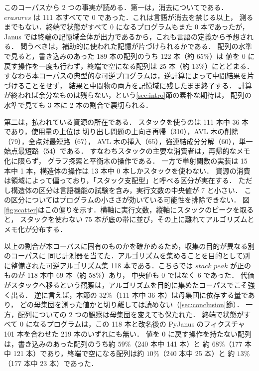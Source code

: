 \documentclass[a4paper,11pt]{jsarticle}
\begin{document}
このコーパスから 2 つの事実が読める．第一は，消去についてである．
$\mathit{erasures}$ は 111 本すべてで 0 であった．これは言語が消去を禁じる以上，
測るまでもない．終端で状態がすべて 0 になるプログラムもまた 0 本であったが，
Janus では終端の記憶域全体が出力であるから，これも言語の定義から予想される．
問うべきは，補助的に使われた記憶が片づけられるかである．
配列の水準で見ると，書き込みのあった 189 本の配列のうち 122 本（約 $65\%$）は
値を 0 に戻す操作を一度も行わず，終端で空になる配列は 25 本（約 $13\%$）にとどまる．
すなわち本コーパスの典型的な可逆プログラムは，逆計算によって中間結果を片づけることをせず，
結果と中間物の両方を記憶域に残したまま終了する．
計算が終われば余分なものは残らない，という\ref{sec:intro}節の素朴な期待は，
配列の水準で見ても 3 本に 2 本の割合で裏切られる．

第二は，払われている資源の所在である．
スタックを使うのは 111 本中 36 本であり，使用量の上位は
切り出し問題の上向き再帰（310），AVL 木の削除（79），全点対最短路（67），
AVL 木の挿入（65），強連結成分分解（60），単一始点最短路（54）である．
すなわちスタックの主要な消費者は，再帰的なメモ化に限らず，
グラフ探索と平衡木の操作である．
一方で単射関数の実装は 15 本中 1 本，構造体の操作は 13 本中 0 本しかスタックを使わない．
資源の消費は領域によって偏っており，「スタック支配型」と呼べる区分が実在する．
ただし構造体の区分は言語機能の試験を含み，実行文数の中央値が 7 と小さい．
この区分についてはプログラムの小ささが効いている可能性を排除できない．
図\ref{fig:scatter}はこの偏りを示す．横軸に実行文数，縦軸にスタックのピークを取ると，
スタックを使わない 75 本が底の帯に並び，その上に離れてアルゴリズムとメモ化が分布する．

以上の割合が本コーパスに固有のものかを確かめるため，収集の目的が異なる別のコーパスに
同じ計測器を当てた．アルゴリズムを集めることを目的として別に整備された可逆アルゴリズム集
118 本である．こちらでは $\mathit{stack\_peak}$ が正のものが 118 本中 69 本（約 $58\%$）あり，
中央値も 0 ではなく 6 であった．
代価がスタックへ移るという観察は，アルゴリズムを目的に集めたコーパスでこそ強く出る．
逆に言えば，本節の $32\%$（111 本中 36 本）は母集団に依存する量であり，
どの母集団を測った値かと切り離しては読めない（\ref{sec:conclusion}節）．
一方，配列についての 2 つの観察は母集団を変えても保たれた．
終端で状態がすべて 0 になるプログラムは，この 118 本と改名後の PyJanus のフィクスチャ
101 本を合わせた 219 本のいずれにも無い．
値を 0 に戻す操作を持たない配列は，書き込みのあった配列のうち約 $59\%$（240 本中 141 本）と
約 $68\%$（177 本中 121 本）であり，終端で空になる配列は約 $10\%$（240 本中 25 本）と
約 $13\%$（177 本中 23 本）であった．
\end{document}
